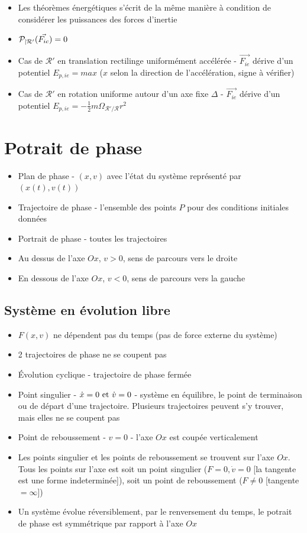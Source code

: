 \documentclass[openany]{book}
\begin{document}
\begin{itemize}
    \item Les théorèmes énergétiques s'écrit de la même manière à condition de considérer les puissances des forces d'inertie
    \item $\mathcal{P}_{|\mathcal{R} '}(\vec{F_{ic}}) = 0$
    \item Cas de $\mathcal{R}'$ en translation rectilinge uniformément accélérée - $\vec{F_{ie}}$ dérive d'un potentiel $E_{p,ie} = max$ ($x$ selon la direction de l'accélération, signe à vérifier)
    \item Cas de $\mathcal{R}'$ en rotation uniforme autour d'un axe fixe $\Delta$ - $\vec{F_{ie}}$ dérive d'un potentiel $E_{p,ie} = -\frac{1}{2}m\Omega_{\mathcal{R}'/\mathcal{R}}r^2$
\end{itemize}

\section{Potrait de phase}
\begin{itemize}
    \item Plan de phase - $(x, v)$ avec l'état du système représenté par $(x(t), v(t))$
    \item Trajectoire de phase - l'ensemble des points $P$ pour des conditions initiales données
    \item Portrait de phase - toutes les trajectoires
    \item Au dessus de l'axe $Ox$, $v > 0$, sens de parcours vers le droite
    \item En dessous de l'axe $Ox$, $v < 0$, sens de parcours vers la gauche
\end{itemize}

\subsection{Système en évolution libre}
\begin{itemize}
    \item $F(x, v)$ ne dépendent pas du temps (pas de force externe du système)
    \item 2 trajectoires de phase ne se coupent pas
    \item Évolution cyclique - trajectoire de phase fermée
    \item Point singulier - $\dot{x} = 0 \text{ et } \dot{v}=0$ - système en équilibre, le point de terminaison ou de départ d'une trajectoire. Plusieurs trajectoires peuvent s'y trouver, mais elles ne se coupent pas
    \item Point de reboussement - $v = 0$ - l'axe $Ox$ est coupée verticalement
    \item Les points singulier et les points de reboussement se trouvent sur l'axe $Ox$. Tous les points sur l'axe est soit un point singulier ($F = 0, \dot{v}=0$ [la tangente est une forme indeterminée]), soit un point de reboussement ($F \neq 0$ [tangente $ = \infty$])
    \item Un système évolue réversiblement, par le renversement du temps, le potrait de phase est symmétrique par rapport à l'axe $Ox$
\end{itemize}
\end{document}
